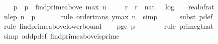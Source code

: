\begin{isabellebody}
\ \ \isamarkupfalse%
\ p\ \ {\isachardoublequoteopen}p\ {\isacharequal}{\kern0pt}\ find{\isacharunderscore}{\kern0pt}prime{\isacharunderscore}{\kern0pt}above\ {\isacharparenleft}{\kern0pt}max\ n\ {}{}{\isacharparenright}{\kern0pt}{\isachardoublequoteclose}\isanewline
\ \ \isamarkupfalse%
\ r\ \ {\isachardoublequoteopen}r\ {\isacharequal}{\kern0pt}\ nat\ {\isacharparenleft}{\kern0pt}{}\ {\isacharasterisk}{\kern0pt}\ {\isasymlceil}log\ {}\ {\isacharparenleft}{\kern0pt}{}\ {\isacharslash}{\kern0pt}\ real{\isacharunderscore}{\kern0pt}of{\isacharunderscore}{\kern0pt}rat\ {\isasymdelta}{\isacharparenright}{\kern0pt}{\isasymrceil}\ {\isacharplus}{\kern0pt}\ {}{}{\isacharparenright}{\kern0pt}{\isachardoublequoteclose}\isanewline
\isanewline
\ \ \isamarkupfalse%
\ n{\isacharunderscore}{\kern0pt}le{\isacharunderscore}{\kern0pt}p{\isacharcolon}{\kern0pt}\ {\isachardoublequoteopen}n\ {\isasymle}\ p{\isachardoublequoteclose}\ \isanewline
\ \ \ \ \isamarkupfalse%
\ {\isacharparenleft}{\kern0pt}rule\ order{\isacharunderscore}{\kern0pt}trans{\isacharbrackleft}{\kern0pt}\ y{\isacharequal}{\kern0pt}{\isachardoublequoteopen}max\ n\ {}{}{\isachardoublequoteclose}{\isacharbrackright}{\kern0pt}{\isacharcomma}{\kern0pt}\ simp{\isacharparenright}{\kern0pt}\isanewline
\ \ \ \ \isamarkupfalse%
\ {\isacharparenleft}{\kern0pt}subst\ p{\isacharunderscore}{\kern0pt}def{\isacharparenright}{\kern0pt}\isanewline
\ \ \ \ \isamarkupfalse%
\ {\isacharparenleft}{\kern0pt}rule\ find{\isacharunderscore}{\kern0pt}prime{\isacharunderscore}{\kern0pt}above{\isacharunderscore}{\kern0pt}lower{\isacharunderscore}{\kern0pt}bound{\isacharparenright}{\kern0pt}\isanewline
\isanewline
\ \ \isamarkupfalse%
\ p{\isacharunderscore}{\kern0pt}ge{\isacharunderscore}{\kern0pt}{}{\isacharcolon}{\kern0pt}\ {\isachardoublequoteopen}p\ {\isachargreater}{\kern0pt}\ {}{\isachardoublequoteclose}\isanewline
\ \ \ \ \isamarkupfalse%
\ {\isacharparenleft}{\kern0pt}rule\ prime{\isacharunderscore}{\kern0pt}gt{\isacharunderscore}{\kern0pt}{}{\isacharunderscore}{\kern0pt}nat{\isacharparenright}{\kern0pt}\isanewline
\ \ \ \ \isamarkupfalse%
\ {\isacharparenleft}{\kern0pt}simp\ add{\isacharcolon}{\kern0pt}p{\isacharunderscore}{\kern0pt}def\ find{\isacharunderscore}{\kern0pt}prime{\isacharunderscore}{\kern0pt}above{\isacharunderscore}{\kern0pt}is{\isacharunderscore}{\kern0pt}prime{\isacharparenright}{\kern0pt}\isanewline

\end{isabellebody}
